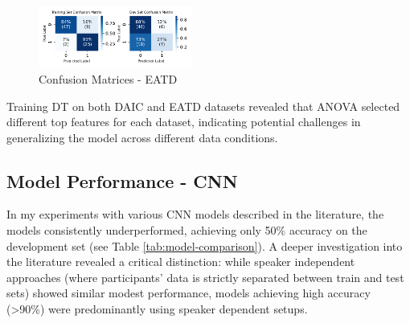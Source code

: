 \begin{table}[H]
    \centering
    \caption{Classification Report on Dev. Set- EATD}
    
    \label{table:classification_report_dev_eatd}
\end{table}


\begin{figure}[H]
\centering
\includegraphics[width=0.45\textwidth]{vis_pdf/eatd_all_confusion_matrices.pdf} %
\caption{Confusion Matrices - EATD}
\label{fig:confusion_matrices_eatd}
\end{figure}

Training DT on both DAIC and EATD datasets revealed that ANOVA selected different top features for each dataset, indicating potential challenges in generalizing the model across different data conditions.

\subsection{Model Performance - CNN}

In my experiments with various CNN models described in the literature, the models consistently underperformed, achieving only 50\% accuracy on the development set (see Table \ref{tab:model-comparison}). A deeper investigation into the literature revealed a critical distinction: while speaker independent approaches (where participants' data is strictly separated between train and test sets) showed similar modest performance, models achieving high accuracy (>90\%) were predominantly using speaker dependent setups.

